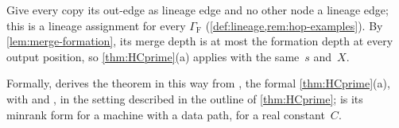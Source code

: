 \begin{outline}
Give every copy its out-edge as lineage edge and no other node a lineage edge; this is a lineage assignment for every
$\Gamma_{\mathrm F}$ (\cref{def:lineage,rem:hop-examples}). By \cref{lem:merge-formation}, its merge depth is at most the
formation depth at every output position, so \cref{thm:HCprime}(a) applies with the same~$s$ and~$X$.

Formally,  derives the theorem in this way from ,
the formal \cref{thm:HCprime}(a), with  and , in
the setting described in the outline of \cref{thm:HCprime}; 
is its minrank form for a machine with a data path, for a real constant~$C$.
\end{outline}

